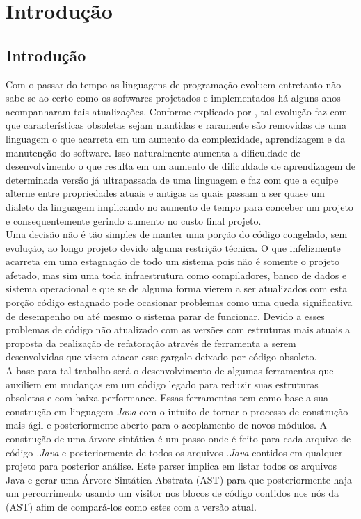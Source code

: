 \chapter{Introdução}
\section{Introdução}


Com o passar do tempo as linguagens de programação evoluem entretanto não sabe-se ao certo como os softwares projetados e implementados há alguns anos acompanharam tais atualizações\cite{dyer2013large}. Conforme explicado por \cite{Overbey:2009:RLR:1639949.1640127}, tal evolução faz com que características obsoletas sejam mantidas e raramente são removidas de uma linguagem o que acarreta em um aumento da complexidade, aprendizagem e da manutenção do software. Isso naturalmente aumenta a dificuldade de desenvolvimento o que resulta em um aumento de dificuldade de aprendizagem de determinada versão já ultrapassada de uma linguagem e faz com que a equipe alterne entre propriedades atuais e antigas as quais passam a ser quase um dialeto da linguagem implicando no aumento de tempo para conceber um projeto e consequentemente gerindo aumento no custo final projeto.\\

Uma decisão não é tão simples de manter uma porção do código congelado, sem evolução, ao longo projeto devido alguma restrição técnica. O que infelizmente acarreta em uma estagnação de todo um sistema pois não é somente o projeto afetado, mas sim uma toda infraestrutura como compiladores, banco de dados e sistema operacional e que se de alguma forma vierem a ser atualizados com esta porção código estagnado pode ocasionar problemas como uma queda significativa de desempenho ou até mesmo o sistema parar de funcionar. Devido a esses problemas de código não atualizado com as versões com estruturas mais atuais a proposta da realização de refatoração através de ferramenta a serem desenvolvidas que visem atacar esse gargalo deixado por código obsoleto.\\

A base para tal trabalho será o desenvolvimento de algumas ferramentas que auxiliem em mudanças em um código legado para reduzir suas estruturas obsoletas e com baixa performance. Essas ferramentas tem como base a sua construção em linguagem {\it Java} com o intuito de tornar o processo de construção mais ágil e posteriormente aberto para o acoplamento de novos módulos. A construção de uma árvore sintática é um passo onde é feito para cada arquivo de código {\it .Java} e posteriormente de todos os arquivos {\it .Java} contidos em qualquer projeto para posterior análise. Este parser implica em listar todos os arquivos Java e gerar uma Árvore Sintática Abstrata (AST) para que posteriormente haja um percorrimento usando um visitor\cite{Gamma:1995:DPE:186897} nos blocos de código contidos nos nós da (AST)\cite{Dyer:2014:MBA:2568225.2568295} afim de compará-los como estes com a versão atual.\\

